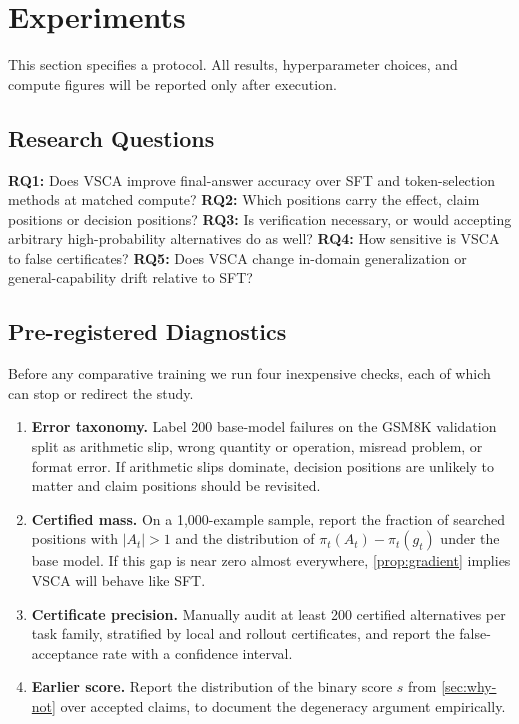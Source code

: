 \documentclass{article}
\newcommand{\vsca}{\textsc{VSCA}}
\newcommand{\acc}{A}
\theoremstyle{plain}
\theoremstyle{remark}
\begin{document}
\section{Experiments}
\label{sec:experiments}
This section specifies a protocol. All results, hyperparameter choices, and compute figures will be reported only after execution.

\subsection{Research Questions}
\label{sec:experimental-design}
\textbf{RQ1:} Does \vsca{} improve final-answer accuracy over SFT and token-selection methods at matched compute? \textbf{RQ2:} Which positions carry the effect, claim positions or decision positions? \textbf{RQ3:} Is verification necessary, or would accepting arbitrary high-probability alternatives do as well? \textbf{RQ4:} How sensitive is \vsca{} to false certificates? \textbf{RQ5:} Does \vsca{} change in-domain generalization or general-capability drift relative to SFT?

\subsection{Pre-registered Diagnostics}
\label{sec:diagnostics}
Before any comparative training we run four inexpensive checks, each of which can stop or redirect the study.
\begin{enumerate}
  \item \textbf{Error taxonomy.} Label 200 base-model failures on the GSM8K validation split as arithmetic slip, wrong quantity or operation, misread problem, or format error. If arithmetic slips dominate, decision positions are unlikely to matter and claim positions should be revisited.
  \item \textbf{Certified mass.} On a 1{,}000-example sample, report the fraction of searched positions with $|\acc_t|>1$ and the distribution of $\pi_t(\acc_t)-\pi_t(g_t)$ under the base model. If this gap is near zero almost everywhere, \cref{prop:gradient} implies \vsca{} will behave like SFT.
  \item \textbf{Certificate precision.} Manually audit at least 200 certified alternatives per task family, stratified by local and rollout certificates, and report the false-acceptance rate with a confidence interval.
  \item \textbf{Earlier score.} Report the distribution of the binary score $s$ from \cref{sec:why-not} over accepted claims, to document the degeneracy argument empirically.
\end{enumerate}
\end{document}
